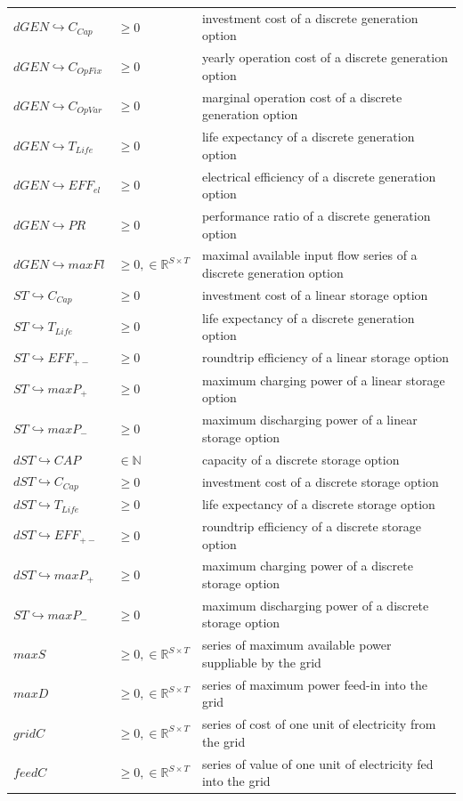 \documentclass[
	11pt,								%
	DIV10,								%
	a4paper,         					%
	oneside,							%
	headheight=20pt,					%
	footheight=20pt,					%
    parskip=full,						%
    listof=totoc,						%
	bibliography=totoc,					%
	index=totoc,						%
]{scrartcl}
\begin{document}
\begin{table}[H]
\begin{tabular}{llp{8cm}}
		$dGEN \hookrightarrow C_{Cap}$ & $\geq 0$ & investment cost of a discrete generation option \\
		$dGEN \hookrightarrow C_{OpFix}$ & $\geq 0$ & yearly operation cost of a discrete generation option \\
		$dGEN \hookrightarrow C_{OpVar}$ & $\geq 0$ & marginal operation cost of a discrete generation option \\
		$dGEN \hookrightarrow T_{Life}$ & $\geq 0$ & life expectancy of a discrete generation option \\
		$dGEN \hookrightarrow EFF_{el}$ & $\geq 0$ & electrical efficiency of a discrete generation option \\
		$dGEN \hookrightarrow PR$ & $\geq 0$ & performance ratio of a discrete generation option \\
		$dGEN \hookrightarrow maxFl$ & $\geq 0, \in \mathbb{R}^{S\times T}$ & maximal available input flow series of a discrete generation option \\
		$ST \hookrightarrow C_{Cap}$ & $\geq 0$ & investment cost of a linear storage option \\
		$ST \hookrightarrow T_{Life}$ & $\geq 0$ & life expectancy of a discrete generation option \\
		$ST \hookrightarrow EFF_{+-}$ & $\geq 0$ & roundtrip efficiency of a linear storage option \\
		$ST \hookrightarrow maxP_+$ & $\geq 0$ & maximum charging power of a linear storage option \\
		$ST \hookrightarrow maxP_-$ & $\geq 0$ & maximum discharging power of a linear storage option \\
		$dST \hookrightarrow CAP$ & $\in \mathbb{N}$ & capacity of a discrete storage option \\
		$dST \hookrightarrow C_{Cap}$ & $\geq 0$ & investment cost of a discrete storage option \\
		$dST \hookrightarrow T_{Life}$ & $\geq 0$ & life expectancy of a discrete storage option \\
		$dST \hookrightarrow EFF_{+-}$ & $\geq 0$ & roundtrip efficiency of a discrete storage option  \\
		$dST \hookrightarrow maxP_+$ & $\geq 0$ & maximum charging power of a discrete storage option \\
		$ST \hookrightarrow maxP_-$ & $\geq 0$ & maximum discharging power of a discrete storage option \\
		$maxS$ & $\geq 0, \in \mathbb{R}^{S\times T}$ & series of maximum available power suppliable by the grid\\
		$maxD$ & $\geq 0, \in \mathbb{R}^{S\times T}$ & series of maximum power feed-in into the grid \\
		$gridC$ & $\geq 0, \in \mathbb{R}^{S\times T}$ & series of cost of one unit of electricity from the grid \\
		$feedC$ & $\geq 0, \in \mathbb{R}^{S\times T}$ & series of value of one unit of electricity fed into the grid \\
		\hline
	\end{tabular}
\end{table}
\end{document}
